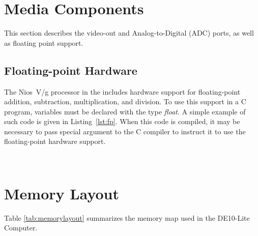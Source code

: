 \documentclass[11pt, twoside, pdftex]{article}
\newcommand{\commonFiles}{../../../common/doc}
\newcommand{\systemName}{DE10-Lite Computer}
\begin{document}
\section{Media Components}
\label{sec:multi}

This section describes the video-out and Analog-to-Digital (ADC) ports,
as well as floating point support.




\subsection{Floating-point Hardware}
\label{sec:fp}

The Nios~V/g processor in the includes hardware support for
floating-point addition, subtraction, multiplication, and division. To use this support in
a C program, variables must be declared with the type {\it float}. A simple example of 
such code is given in Listing~\ref{lst:fp}. When this code is compiled, it may be necessary 
to pass special argument to the C compiler to instruct it to 
use the floating-point hardware support.





~\\
\newpage
\section{Memory Layout}

\noindent
Table \ref{tab:memorylayout} summarizes the memory map used in the \systemName.
~\\
~\\
\end{document}
